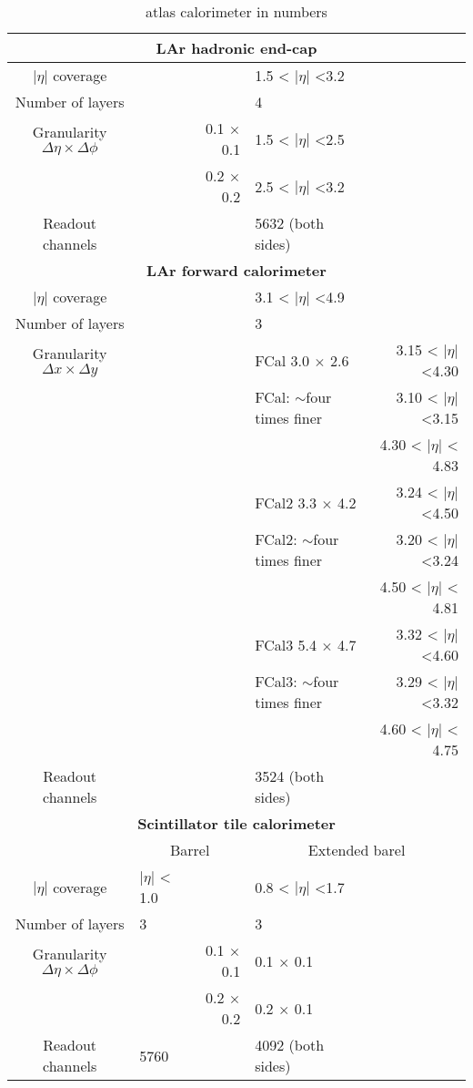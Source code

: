 \begin{table}
\begin{tabular}{|c|l r| l r|}
			\hline	
			\multicolumn{5}{|c|}{\textbf{LAr hadronic end-cap}} \\
			\hline
			$|\eta|$  coverage &  &  & 1.5 < $|\eta|$  <3.2 & \\
			Number of layers &  &  & 4 & \\
			\hline
			Granularity $\Delta \eta \times \Delta \phi$ &  & 0.1 $\times$ 0.1 & 1.5 < $|\eta|$  <2.5 & \\
			 &  & 0.2 $\times$ 0.2 & 2.5 < $|\eta|$  <3.2 & \\
			\hline
			Readout channels&  &  &5632 (both sides)\\
			\hline	
			\multicolumn{5}{|c|}{\textbf{LAr forward calorimeter}} \\
			\hline
			$|\eta|$  coverage &  &  & 3.1 < $|\eta|$  <4.9 & \\
			Number of layers &  &  & 3 & \\
			\hline
			Granularity $\Delta x \times \Delta y$ &  & & FCal 3.0 $\times$ 2.6 & 3.15 < $|\eta|$  <4.30  	\\
			&  & &FCal: $\sim$four times finer & 3.10 < $|\eta|$  <3.15  \\
			&  &  & & 4.30 < $|\eta|$  < 4.83  \\
			&  & & FCal2 3.3 $\times$ 4.2 & 3.24 < $|\eta|$  <4.50  \\			
			&  & & FCal2: $\sim$four times finer & 3.20 < $|\eta|$  <3.24 \\
			&  &  & & 4.50 < $|\eta|$  < 4.81 \\
			&  & & FCal3 5.4 $\times$ 4.7 & 3.32 < $|\eta|$  <4.60 \\			
			&  & & FCal3: $\sim$four times finer & 3.29 < $|\eta|$  <3.32  \\
			&  &  & & 4.60 < $|\eta|$  < 4.75  \\
			\hline
			Readout channels&  &  &3524 (both sides)\\
			\hline	
			\multicolumn{5}{|c|}{\textbf{Scintillator tile calorimeter}} \\
			\hline
			& \multicolumn{2}{|c|}{ Barrel} & \multicolumn{2}{|c|}{ Extended barel} \\
			\hline
			$|\eta|$  coverage & $|\eta|$  < 1.0 &  & 0.8 < $|\eta|$  <1.7 & \\
			Number of layers &  3 &  & 3 & \\
			\hline
			Granularity $\Delta \eta \times \Delta \phi$ &  & 0.1 $\times$ 0.1 & 0.1 $\times$ 0.1  & \\
			&  & 0.2 $\times$ 0.2 & 0.2 $\times$ 0.1  & \\
			\hline
			Readout channels&  5760 &  &4092 (both sides)\\
			\hline	
	\end{tabular}\\
	\caption{ \gls{atlas} calorimeter in numbers}
	\label{tab::calorimeter_table}
\end{table}
	
